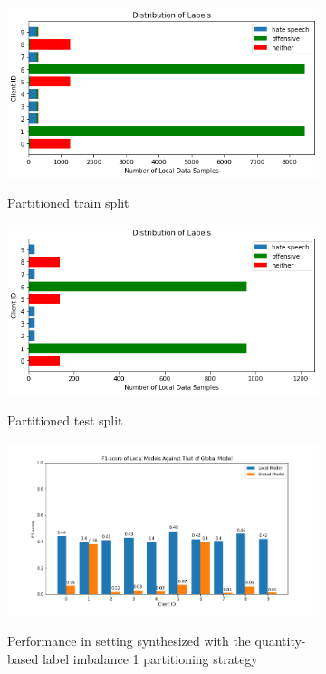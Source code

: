 \documentclass[letterpaper]{article} %
\begin{document}
\begin{figure}[hbt!]

\begin{subfigure}{\columnwidth}
{\includegraphics[width=\columnwidth]{noniid-quantity-based-label-imbalance-1_distribution_of_labels_5}}
\caption{Partitioned train split}
\end{subfigure}

\begin{subfigure}{\columnwidth}
{\includegraphics[width=\columnwidth]{noniid-quantity-based-label-imbalance-1_test_set_distribution_of_labels_5}}
\caption{Partitioned test split}
\end{subfigure}

\begin{subfigure}{\columnwidth}
{\includegraphics[width=\columnwidth]{noniid-quantity-based-label-imbalance-1_seed_5performance_of_models_on_client_data_f1score}}
\caption{Performance in setting synthesized with the quantity-based label imbalance 1 partitioning strategy}
\end{subfigure}

\caption{}
\end{figure}
\end{document}
